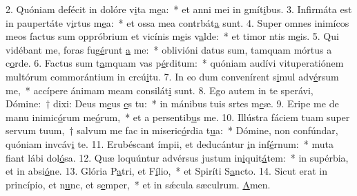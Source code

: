 2. Quóniam defécit in dolóre v\uline{i}ta m\uline{e}a:~* et anni mei in gmít\uline{i}bus.
3. Infirmáta est in paupertáte v\uline{i}rtus m\uline{e}a:~* et ossa mea contrbát\uline{a} sunt.
4. Super omnes inimícos meos factus sum oppróbrium et vicínis m\uline{e}is v\uline{a}lde:~* et timor ntis m\uline{e}is.
5. Qui vidébant me, foras fug\uline{é}runt \uline{a} me:~* oblivióni datus sum, tamquam mórtus a c\uline{o}rde.
6. Factus sum t\uline{a}mquam vas p\uline{é}rditum:~* quóniam audívi vituperatiónem multórum commorántium in crcú\uline{i}tu.
7. In eo dum convenírent s\uline{i}mul adv\uline{é}rsum me,~* accípere ánimam meam consilát\uline{i} sunt.
8. Ego autem in te sperávi, Dómine:~† dixi: Deus m\uline{e}us \uline{e}s tu:~* in mánibus tuis srtes m\uline{e}æ.
9. Eripe me de manu inimic\uline{ó}rum me\uline{ó}rum,~* et a persentib\uline{u}s me.
10. Illústra fáciem tuam super servum tuum,~† salvum me fac in miseric\uline{ó}rdia t\uline{u}a:~* Dómine, non confúndar, quóniam invcáv\uline{i} te.
11. Erubéscant ímpii, et deducántur \uline{i}n inf\uline{é}rnum:~* muta fiant lábi dol\uline{ó}sa.
12. Quæ loquúntur advérsus justum in\uline{i}quit\uline{á}tem:~* in supérbia, et in absi\uline{ó}ne.
13. Glória P\uline{a}tri, et F\uline{í}lio,~* et Spiríti S\uline{a}ncto.
14. Sicut erat in princípio, et n\uline{u}nc, et s\uline{e}mper,~* et in sǽcula sæculrum. \uline{A}men.
